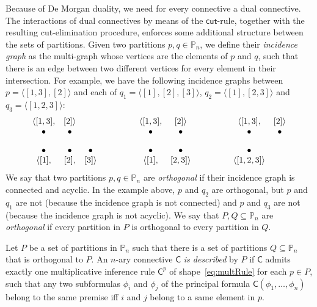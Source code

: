 \documentclass{lmcs} %
\def\cutr{\mathsf {cut}}
\newcommand{\vbul}[1]{\flowvertex{\bullet}{n#1}}
\newcommand{\flowvertex}[2]{\mathord{%
    \tikz[remember picture,baseline=(#2\nodecode.base)]%
    \node[inner sep=0pt](#2\nodecode){$#1\strut$};}}
\newcommand{\blackedge}[2]{%
	\tikz[>=stealth,overlay,remember picture,thick,opacity=1]%
	\draw[-] (#1\nodecode) -- (#2\nodecode);
}
\newcommand{\blackedges}[1]{
	\foreach \aaa/\bbb in {#1} {\blackedge{\aaa}{\bbb}}
}
\newcommand{\blackbendedge}[2]{%
	\tikz[>=stealth,overlay,remember picture,thick,opacity=1]%
	\draw (#1\nodecode) to [bend left] (#2\nodecode);
}
\newcommand{\blackbendedges}[1]{
	\foreach \aaa/\bbb in {#1} {\blackbendedge{\aaa}{\bbb}}
}
\def\nodecode{}
\theoremstyle{plain}
\def\Ccon{\mathsf C}
\def\partition#1{\langle #1\rangle}
\def\block#1{[#1]}
\def\partof#1{\mathbb P_{#1}}
\def\partofn{\partof n}
\begin{document}
Because of De Morgan duality, we need for every connective a dual connective.
The interactions of dual connectives by means of the $\cutr$-rule, together with the resulting cut-elimination procedure, enforces some additional structure between the sets of partitions.
Given two partitions $p,q\in \partofn$, we define their \emph{incidence graph} as the multi-graph whose vertices are the elements of $p$ and $q$, such that there is an edge between two different vertices for every element in their intersection.
For example, we have the following incidence graphs between $p=\partition{\block{1,3},\block 2}$ and each of $q_1=\partition{\block 1, \block 2, \block{3}}$, $q_2=\partition{\block{1},\block{2,3}}$ and $q_3=\partition{\block{1,2,3}}$:
$$
\begin{array}{cccccc}
\partition{{\block{1,3}} ,&{\block{2}}}
\\
\vbul{1}& \vbul{2}
\\[1em]
\vbul{4}&\vbul{5}&\vbul{6}
\\
\partition{{\block{1}} ,&{\block{2}}, & {\block{3}}}
\end{array}
\blackedges{n1/n4,n2/n5,n1/n6}
\qquad\qquad
\begin{array}{cccccc}
	\partition{{\block{1,3}} ,&{\block{2}}}
	\\
	\vbul{1}& \vbul{2}
	\\[1em]
	\vbul{4}& \vbul{5}
	\\
	\partition{{\block{1}} ,& {\block{2,3}}}
\end{array}
\blackedges{n1/n4,n2/n5,n1/n5}
\qquad\qquad
\begin{array}{cccccc}
	\partition{{\block{1,3}} ,&{\block{2}}}
	\\
	\vbul{1}& \vbul{2}
	\\[1em]
	\vbul{4}
	\\
	\partition{\block{1,2,3}}
\end{array}
\blackedges{n2/n4}
\blackbendedges{n1/n4,n4/n1}
$$
We say that two partitions $p,q\in\partofn$ are \emph{orthogonal} if their incidence graph is connected and acyclic.
In the example above, $p$ and $q_2$ are orthogonal, but $p$ and $q_1$ are not (because the incidence graph is not connected) and $p$ and $q_3$ are not (because the incidence graph is not acyclic).
We say that $P,Q\subseteq \partofn$ are \emph{orthogonal} if every partition in $P$ is orthogonal to every partition in $Q$.
\begin{defi}
	Let $P$ be a set of partitions in $\partofn$ such that there is a set of partitions $Q\subseteq\partofn$ that is orthogonal to $P$.
%	
        An $n$-ary connective $\Ccon$ \emph{is described} by $P$  
if $\Ccon$ admits exactly one multiplicative inference rule $\Ccon^p$ of shape~\eqref{eq:multRule} for each $p\in P$, such that any
two subformulas $\phi_i$ and $\phi_j$ of the principal formula $\Ccon(\phi_1, \dots, \phi_n)$ belong to the same premise iff $i$ and $j$ belong to a same element in $p$.
\end{defi}
 
\end{document}
